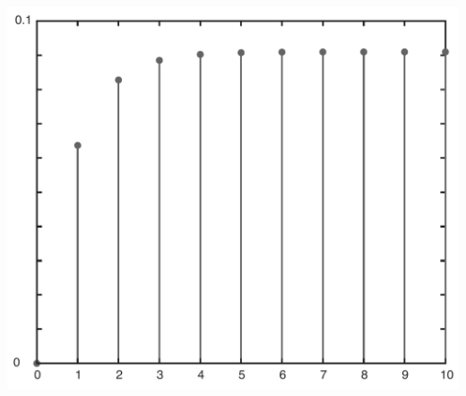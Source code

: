 \documentclass[twoside]{article}
\begin{document}
    \begin{center}
\begin{minipage}[h]{0.5\linewidth}
    \begin{center}
      \includegraphics[width=\textwidth]{normal}
    \end{center}
\end{minipage}
    \end{center}
%
\end{document}
